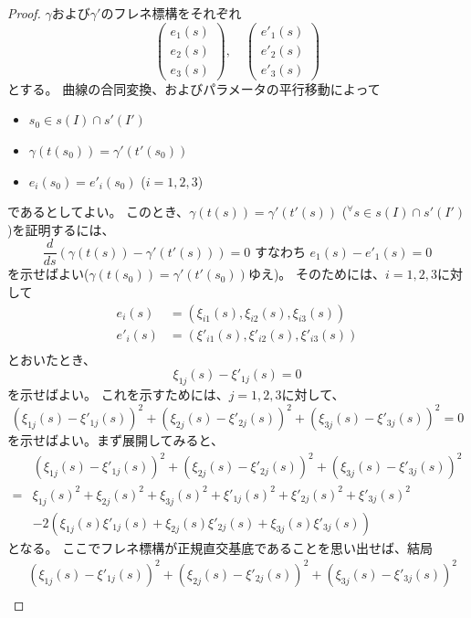 \begin{proof}
  $\gamma$および$\gamma'$のフレネ標構をそれぞれ
  \[
    \begin{pmatrix}
      e_1(s)\\
      e_2(s)\\
      e_3(s)
    \end{pmatrix},\quad
    \begin{pmatrix}
      e'_1(s)\\
      e'_2(s)\\
      e'_3(s)
    \end{pmatrix}
  \]
  とする。
  曲線の合同変換、およびパラメータの平行移動によって
  \begin{itemize}
    \item $s_0\in s(I)\cap s'(I')$
    \item $\gamma(t(s_0))=\gamma'(t'(s_0))$
    \item $e_i(s_0)=e'_i(s_0)$ ($i=1,2,3$)
  \end{itemize}
  であるとしてよい。
  このとき、$\gamma(t(s))=\gamma'(t'(s))$ (${}^\forall s\in s(I)\cap s'(I')$)を証明するには、
  \[
    \frac{d}{ds}(\gamma(t(s))-\gamma'(t'(s)))=0 \text{ すなわち } e_1(s)-e'_1(s)=0
  \]
  を示せばよい($\gamma(t(s_0))=\gamma'(t'(s_0))$ゆえ)。
  そのためには、$i=1,2,3$に対して
  \begin{align*}
    e_i(s)&=(\xi_{i1}(s),\xi_{i2}(s),\xi_{i3}(s))\\
    e'_i(s)&=(\xi'_{i1}(s),\xi'_{i2}(s),\xi'_{i3}(s))\\
  \end{align*}
  とおいたとき、
  \[
    \xi_{1j}(s)-\xi'_{1j}(s)=0
  \]
  を示せばよい。
  これを示すためには、$j=1,2,3$に対して、
  \[
    (\xi_{1j}(s)-\xi'_{1j}(s))^2+(\xi_{2j}(s)-\xi'_{2j}(s))^2+(\xi_{3j}(s)-\xi'_{3j}(s))^2=0
  \]
  を示せばよい。まず展開してみると、
  \begin{align*}
    &(\xi_{1j}(s)-\xi'_{1j}(s))^2+(\xi_{2j}(s)-\xi'_{2j}(s))^2+(\xi_{3j}(s)-\xi'_{3j}(s))^2\\
    =&\xi_{1j}(s)^2+\xi_{2j}(s)^2+\xi_{3j}(s)^2+\xi'_{1j}(s)^2+\xi'_{2j}(s)^2+\xi'_{3j}(s)^2\\
    &-2(\xi_{1j}(s)\xi'_{1j}(s)+\xi_{2j}(s)\xi'_{2j}(s)+\xi_{3j}(s)\xi'_{3j}(s))
  \end{align*}
  となる。
  ここでフレネ標構が正規直交基底であることを思い出せば、結局
  \begin{align*}
    &(\xi_{1j}(s)-\xi'_{1j}(s))^2+(\xi_{2j}(s)-\xi'_{2j}(s))^2+(\xi_{3j}(s)-\xi'_{3j}(s))^2\\

\end{align*}
\end{proof}
